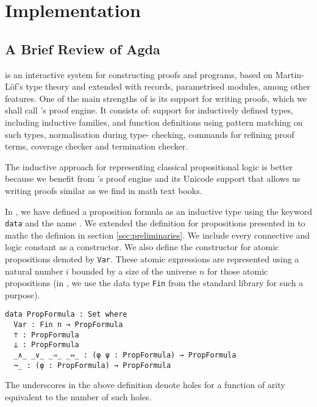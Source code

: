 \documentclass[../main.tex]{subfiles}
\begin{document}

\section{Implementation}
\label{sec:implementation}


\subsection{A Brief Review of Agda}
\label{ssec:agda-definition}

\Agda is an interactive system for constructing proofs and programs,
based on Martin-L\"{o}f's type theory and extended with records,
parametrised modules, among other features. One of the main
strengths of \Agda is its support for writing proofs, which we shall
call \Agda's proof engine. It consists of: support for inductively
defined types, including inductive families, and function
definitions using pattern matching on such types, normalisation
during type- checking, commands for refining proof terms, coverage
checker and termination checker.

The inductive approach for representing classical propositional
logic is better because we benefit from \Agda's proof engine and its
Unicode support that allows us writing proofs similar as we find in
math text books.

In \Agda, we have defined a proposition formula
as an inductive type using the keyword \texttt{data} and the name
.
We extended the definition for propositions presented in
\cite{Altenkirch2015} to mathc the definion in section
\ref{sec:preliminaries}.
We include every connective and logic constant as a constructor.
We also define the constructor for atomic propositions denoted by
\verb!Var!. These atomic expressions are represented using a natural
number $i$ bounded by a size of the universe $n$ for those atomic
propositions (in \Agda, we use the data type \verb!Fin! from the
standard  library for such a purpose).

\begin{verbatim}
data PropFormula : Set where
  Var : Fin n → PropFormula
  ⊤ : PropFormula
  ⊥ : PropFormula
  _∧_ _∨_ _⇒_ _⇔_ : (φ ψ : PropFormula) → PropFormula
  ¬_ : (φ : PropFormula) → PropFormula
\end{verbatim}

\begin{remark}
The underscores in the above definition denote holes for a function of arity equivalent to the number of such holes.
\end{remark}
\end{document}
